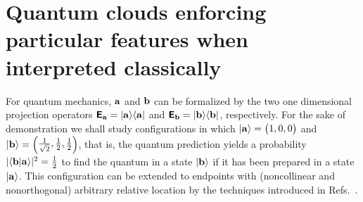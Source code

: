 \documentclass[%
  reprint,
  twocolumn,
 showpacs,
 showkeys,
 preprintnumbers,
 amsmath,amssymb,
 aps,
  prl,
  longbibliography,
 ]{revtex4-1}
\begin{document}
\section{Quantum clouds enforcing particular features when interpreted classically}

For quantum mechanics, ${\bf a}$ and ${\bf b}$ can be
formalized by the two one dimensional projection operators
$\textsf{\textbf{E}}_{\bf a} =\vert {\bf a} \rangle \langle {\bf a}\vert$ and
$\textsf{\textbf{E}}_{\bf b} =\vert {\bf b} \rangle \langle {\bf b}\vert$, respectively.
For the sake of demonstration we shall study configurations in which
$\vert {\bf a} \rangle = \begin{pmatrix}1,0,0\end{pmatrix}$
and
$\vert {\bf b} \rangle = \begin{pmatrix}   \frac{1}{\sqrt{2}},\frac{1}{2},\frac{1}{2} \end{pmatrix}$,
that is, the quantum prediction yields a probability $\vert \langle {\bf b} \vert {\bf a} \rangle \vert^2 = \frac{1}{2}$
to find
the quantum in a state $\vert {\bf b} \rangle$ if it has been prepared in a state $\vert {\bf a}\rangle$.
This configuration can be extended to endpoints with (noncollinear and nonorthogonal) arbitrary relative location
by the techniques introduced in Refs.~\cite{2015-AnalyticKS,Ramanathan-18}.
\end{document}

